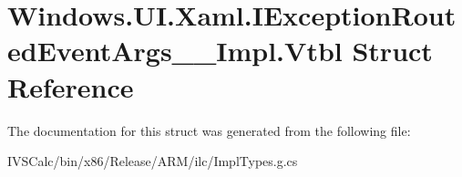 \hypertarget{struct_windows_1_1_u_i_1_1_xaml_1_1_i_exception_routed_event_args_____impl_1_1_vtbl}{}\section{Windows.\+U\+I.\+Xaml.\+I\+Exception\+Routed\+Event\+Args\+\_\+\+\_\+\+Impl.\+Vtbl Struct Reference}
\label{struct_windows_1_1_u_i_1_1_xaml_1_1_i_exception_routed_event_args_____impl_1_1_vtbl}


The documentation for this struct was generated from the following file\+:\begin{DoxyCompactItemize}
\item 
I\+V\+S\+Calc/bin/x86/\+Release/\+A\+R\+M/ilc/Impl\+Types.\+g.\+cs\end{DoxyCompactItemize}
